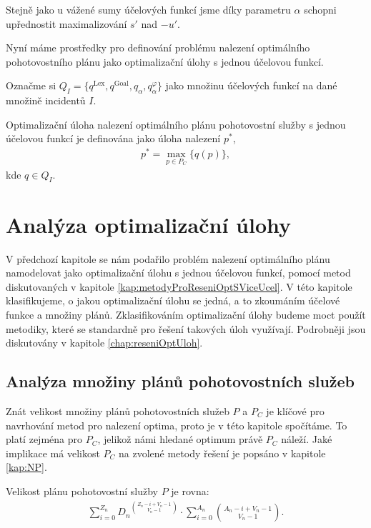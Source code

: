 Stejně jako u vážené sumy účelových funkcí jsme díky parametru $\alpha$ schopni upřednostit maximalizování $s'$ nad $-u'$.

Nyní máme prostředky pro definování problému nalezení optimálního pohotovostního plánu jako optimalizační úlohy s jednou účelovou funkcí.

Označme si $Q_I = \{ q^{\text{Lex}}, q^{\text{Goal}}, q_{\alpha}, q_{\alpha}^{\varphi}\}$ jako množinu účelových funkcí na dané množině incidentů $I$.
\begin{definice}\label{df:optUloha1uc}
  Optimalizační úloha nalezení optimálního plánu pohotovostní služby s jednou účelovou funkcí je definována jako úloha nalezení $p^*$,
  \begin{align}
    p^* = \max_{p \in P_C} \{ q(p) \},
  \end{align}
  kde $q \in Q_I$.
\end{definice}

\section{Analýza optimalizační úlohy}

V předchozí kapitole se nám podařilo problém nalezení optimálního plánu namodelovat jako optimalizační úlohu s jednou účelovou funkcí,
pomocí metod diskutovaných v kapitole \ref{kap:metodyProReseniOptSViceUcel}.
V této kapitole klasifikujeme, o jakou optimalizační úlohu se jedná, a to zkoumáním účelové funkce a množiny plánů.
Zklasifikováním optimalizační úlohy budeme moct použít metodiky, které se standardně pro řešení takových úloh využívají. 
Podrobněji jsou diskutovány v kapitole \ref{chap:reseniOptUloh}.

\subsection{Analýza množiny plánů pohotovostních služeb}\label{kap:analP}

Znát velikost množiny plánů pohotovostních služeb $P$ a $P_C$ je klíčové pro navrhování metod pro nalezení optima, proto je v této kapitole spočítáme.
To platí zejména pro $P_C$, jelikož námi hledané optimum právě $P_C$ náleží.
Jaké implikace má velikost $P_C$ na zvolené metody řešení je popsáno v kapitole \ref{kap:NP}.

\begin{veta}\label{veta:velikostP}
  Velikost plánu pohotovostní služby $P$ je rovna:
  \begin{align*}
    \sum_{i = 0}^{Z_n} {D_n}^{\binom{Z_n - i + V_n - 1}{V_n - 1}} \cdot \sum_{i = 0}^{A_n} {\binom{A_n - i + V_n - 1}{V_n - 1}}.
  \end{align*}
\end{veta}

